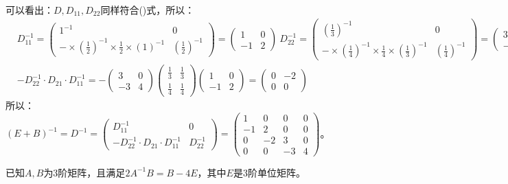 \documentclass[a4paper]{report}
\begin{document}
\begin{jie}
\begin{align*}
\end{align*}
可以看出：$D,D_{11},D_{22}$同样符合(\uppercase\expandafter{})式，所以：
\begin{align*}
&D_{11}^{-1}=
\begin{pmatrix}
1^{-1}&0\\
-\times\left(\frac{1}{2}\right)^{-1}\times\frac{1}{2}\times(1)^{-1}&\left(\frac{1}{2}\right)^{-1}
\end{pmatrix}=
\begin{pmatrix}
1&0\\
-1&2
\end{pmatrix}~
D_{22}^{-1}=
\begin{pmatrix}
\left(\frac{1}{3}\right)^{-1}&0\\
-\times\left(\frac{1}{4}\right)^{-1}\times\frac{1}{4}\times\left(\frac{1}{3}\right)^{-1}&\left(\frac{1}{4}\right)^{-1}
\end{pmatrix}=
\begin{pmatrix}
3&0\\
-3&4
\end{pmatrix}
\\ &
-D_{22}^{-1}\cdot D_{21}\cdot D_{11}^{-1}=-\begin{pmatrix}
3&0\\
-3&4
\end{pmatrix}\begin{pmatrix}
\frac{1}{3}&\frac{1}{3}\\
\frac{1}{4}&\frac{1}{4}
\end{pmatrix}\begin{pmatrix}
1&0\\
-1&2
\end{pmatrix}=
\begin{pmatrix}
0&-2\\
0&0
\end{pmatrix}
\end{align*}
所以：
$
(E+B)^{-1}=D^{-1}=\begin{pmatrix}
D_{11}^{-1}&0\\
-D_{22}^{-1}\cdot D_{21}\cdot D_{11}^{-1}&D_{22}^{-1}
\end{pmatrix}=
\begin{pmatrix}
1&0&0&0\\
-1&2&0&0\\
0&-2&3&0\\
0&0&-3&4
\end{pmatrix}
$。
\end{jie}

\EX 已知$A,B$为3阶矩阵，且满足$2A^{-1}B=B-4E$，其中$E$是3阶单位矩阵。
\end{document}
